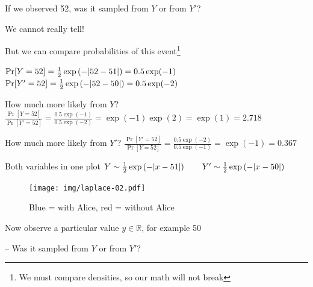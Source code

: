 \documentclass[12pt,aspectratio=169,handout]{beamer}
\begin{document}
\begin{frame}{If we observed 52, was it sampled from $Y$ or from $Y'$?}

We cannot really tell!

But we can compare probabilities of this event\footnote{We must compare densities, so our math will not break}

$
\Pr[Y = 52] = \frac{1}{2} \exp \left( -\abs{52 - 51} \right) = 0.5 \exp(-1)
$
$
\Pr[Y' = 52] = \frac{1}{2} \exp \left( -\abs{52 - 50} \right) = 0.5 \exp(-2)
$

How much more likely from $Y$?
$
\frac{\Pr[Y = 52]}{\Pr[Y' = 52]}
= \frac{0.5 \exp(-1)}{0.5 \exp(-2)} = \exp(-1)\exp(2) = \exp(1) = 2.718
$

How much more likely from $Y'$?
$
\frac{\Pr[Y' = 52]}{\Pr[Y = 52]}
= \frac{0.5 \exp(-2)}{0.5 \exp(-1)} = \exp(-1) = 0.367
$

\end{frame}



\begin{frame}{Both variables in one plot}
$
Y \sim  \frac{1}{2} \exp \left(- \abs{x - 51} \right) \qquad
Y' \sim \frac{1}{2} \exp \left(- \abs{x - 50} \right) 
$

\begin{figure}
\centering
\texttt{[image: img/laplace-02.pdf]}
\caption{Blue = with Alice, red = without Alice}
\end{figure}

Now observe a particular value $y \in \mathbb{R}$, for example 50

-- Was it sampled from $Y$ or from $Y'$?

\end{frame}
\end{document}
